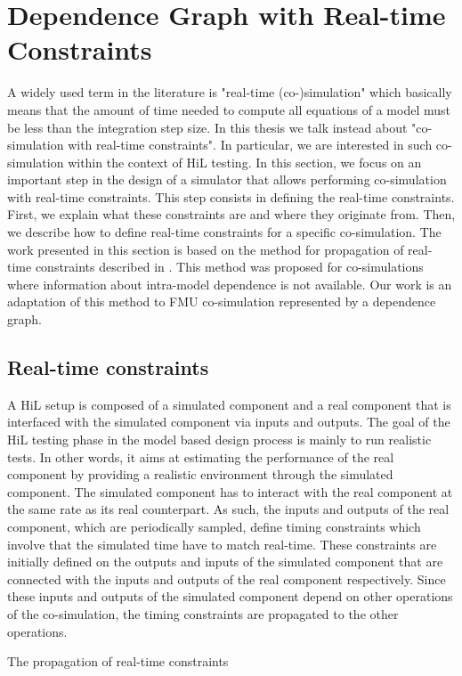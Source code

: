 \section{Dependence Graph with Real-time Constraints}

A widely used term in the literature is "real-time (co-)simulation" \cite{belanger:2010} which basically means that the amount of time needed to compute all equations of a model must be less than the integration step size. In this thesis we talk instead about "co-simulation with real-time constraints". In particular, we are interested in such co-simulation within the context of HiL testing. In this section, we focus on an important step in the design of a simulator that allows performing co-simulation with real-time constraints. This step consists in defining the real-time constraints. First, we explain what these constraints are and where they originate from. Then, we describe how to define real-time constraints for a specific co-simulation. The work presented in this section is based on the method for propagation of real-time constraints described in \cite{faure:2011}. This method was proposed for co-simulations where information about intra-model dependence is not available. Our work is an adaptation of this method to FMU co-simulation represented by a dependence graph.

\subsection{Real-time constraints}

A HiL setup is composed of a simulated component and a real component that is interfaced with the simulated component via inputs and outputs. The goal of the HiL testing phase in the model based design process is mainly to run realistic tests. In other words, it aims at estimating the performance of the real component by providing a realistic environment through the simulated component. The simulated component has to interact with the real component at the same rate as its real counterpart. As such, the inputs and outputs of the real component, which are periodically sampled, define timing constraints which involve that the simulated time have to match real-time. These constraints are initially defined on the outputs and inputs of the simulated component that are connected with the inputs and outputs of the real component respectively. Since these inputs and outputs of the simulated component depend on other operations of the co-simulation, the timing constraints are propagated to the other operations.

The propagation of real-time constraints   


